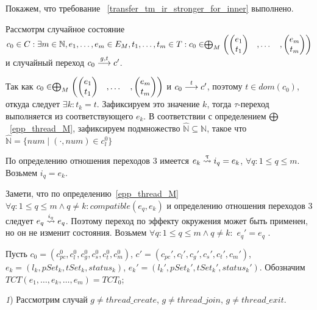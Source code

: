Покажем, что требование ~\ref{transfer_tm_ir_stronger_for_inner} выполнено.

Рассмотрм случайное состояние $c_0 \in C: \exists m \in \mathbb{N}, e_1, \dots, e_m \in E_M, t_1, \dots, t_m \in T: c_0 \in \mathrel{\bigoplus}_M
\begin{pmatrix}
\begin{pmatrix}
e_1 \\
t_1 
\end{pmatrix}& ,
\dots& ,
\begin{pmatrix}
e_m \\
t_m 
\end{pmatrix}
\end{pmatrix}$
и случайный переход $c_0 \stackrel{g,t}{\longrightarrow} c'$.

Так как $c_0 \in \mathrel{\bigoplus}_M
\begin{pmatrix}
\begin{pmatrix}
e_1 \\
t_1 
\end{pmatrix}& ,
\dots& ,
\begin{pmatrix}
e_m \\
t_m 
\end{pmatrix}
\end{pmatrix}$ и $c_0 \stackrel{t}{\longrightarrow} c'$, поэтому $t \in dom(c_0)$, откуда следует $\exists k: t_k = t$. 
Зафиксируем это значение $k$, тогда $\tau$-переход выполняется из соответствующего $e_k$.
В соответствии с определением $\mathrel{\bigoplus}$~\ref{epp_thread_M}, зафиксируем подмножество $\widehat{\mathbb{N}} \subseteq \mathbb{N}$, такое что $\widehat{\mathbb{N}}=\{num \mid (\cdot, num) \in c^0_l\}$

По определению отношения переходов 3 имеется $e_k \stackrel{\uptau}{\leadsto} i_q=e_k$, $\forall q: 1 \le q \le m$. Возьмем $i_q=e_k$.

Замети, что по определению~\ref{epp_thread_M} $\forall q: 1 \le q \le m \land q \neq k: compatible(e_q, e_k)$ и определению отношения переходов 3 следует $e_q \stackrel{i_q}{\leadsto} e_q$. 
Поэтому переход по эффекту окружения может быть применен, но он не изменит состояния.
Возьмем $\forall q: 1 \le q \le m \land q \neq k:$ $e_q' = e_q$ .

Пусть $c_0 = (c_{pc}^0, c_l^0, c_g^0, c_s^0, c^0_t, c^0_m)$, $c' = (c_{pc}', c_l', c_g', c_s', c_t', c_m')$, $e_k=(l_k, pSet_k, tSet_k, status_k)$, $e_k'=(l_k', pSet_k', tSet_k', status_k')$.
Обозначим $TCT(e_1, \dots, e_k, \dots, e_m) = TCT_0$;

{\textit 1)} Рассмотрим случай $g \neq thread\_create$, $g \neq thread\_join$, $g \neq thread\_exit$.

